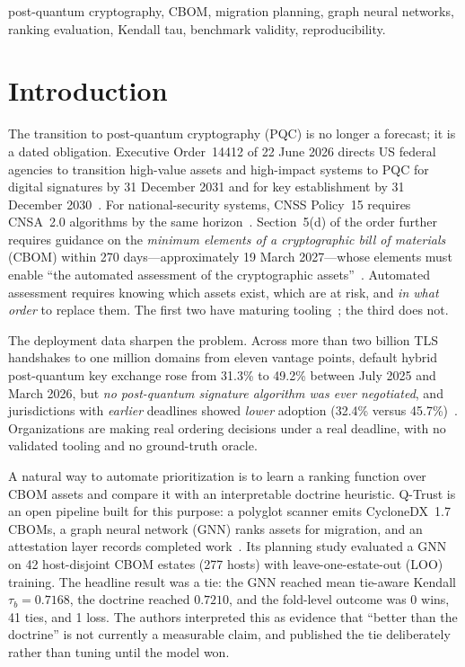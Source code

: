 \documentclass[conference,10pt]{IEEEtran}
\newcommand{\tb}{\tau_b}
\begin{document}
\begin{IEEEkeywords}
post-quantum cryptography, CBOM, migration planning, graph neural networks, ranking evaluation,
Kendall tau, benchmark validity, reproducibility.
\end{IEEEkeywords}

\section{Introduction}

The transition to post-quantum cryptography (PQC) is no longer a forecast; it is a dated
obligation. Executive Order~14412 of 22 June 2026 directs US federal agencies to transition
high-value assets and high-impact systems to PQC for digital signatures by 31 December 2031
and for key establishment by 31 December 2030~\cite{eo14412}. For national-security systems,
CNSS Policy~15 requires CNSA~2.0 algorithms by the same horizon~\cite{cnssp15}. Section~5(d) of
the order further requires guidance on the \emph{minimum elements of a cryptographic bill of
materials} (CBOM) within 270 days---approximately 19 March 2027---whose elements must enable
``the automated assessment of the cryptographic assets''~\cite{eo14412}. Automated assessment
requires knowing which assets exist, which are at risk, and \emph{in what order} to replace
them. The first two have maturing tooling~\cite{cyclonedx,ibm_cbom,hess2026,cryptoscope}; the
third does not.

The deployment data sharpen the problem. Across more than two billion TLS handshakes to one
million domains from eleven vantage points, default hybrid post-quantum key exchange rose from
31.3\% to 49.2\% between July 2025 and March 2026, but \emph{no post-quantum signature
algorithm was ever negotiated}, and jurisdictions with \emph{earlier} deadlines showed
\emph{lower} adoption (32.4\% versus 45.7\%)~\cite{mindthegap2026}. Organizations are making
real ordering decisions under a real deadline, with no validated tooling and no ground-truth
oracle.

A natural way to automate prioritization is to learn a ranking function over CBOM assets and
compare it with an interpretable doctrine heuristic. Q-Trust is an open pipeline built for this
purpose: a polyglot scanner emits CycloneDX~1.7 CBOMs, a graph neural network (GNN) ranks
assets for migration, and an attestation layer records completed
work~\cite{qtrust_repo}. Its planning study evaluated a GNN on 42 host-disjoint CBOM estates
(277 hosts) with leave-one-estate-out (LOO) training. The headline result was a tie: the GNN
reached mean tie-aware Kendall $\tb=0.7168$, the doctrine reached $0.7210$, and the fold-level
outcome was 0 wins, 41 ties, and 1 loss. The authors interpreted this as evidence that
``better than the doctrine'' is not currently a measurable claim, and published the tie
deliberately rather than tuning until the model won.
\end{document}
